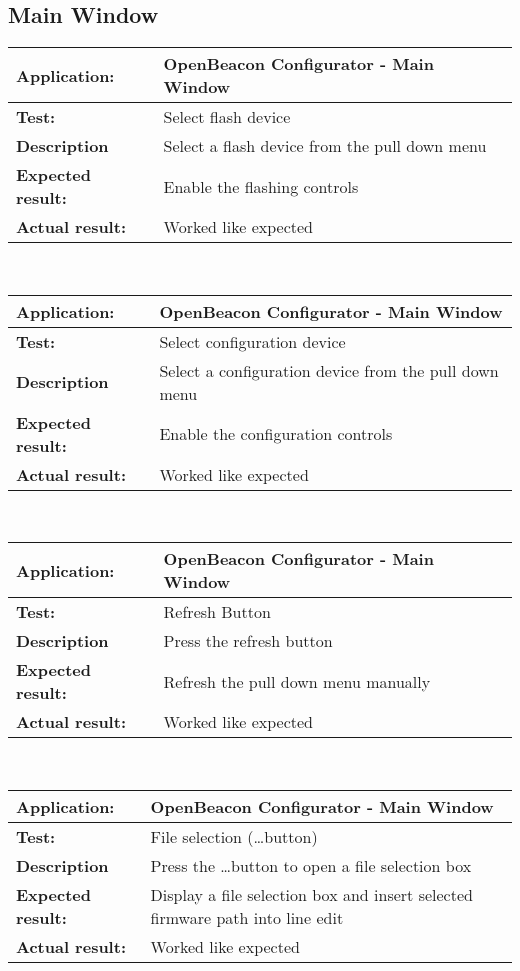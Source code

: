   \subsection{Main Window}
   \begin{tabular}{|p{3.5cm}|p{10.5cm}|}
    \hline
     \textbf{Application:}	& OpenBeacon Configurator - Main Window\\
    \hline
     \textbf{Test:}		& Select flash device\\
    \hline
     \textbf{Description}	& Select a flash device from the pull down menu\\
    \hline
     \textbf{Expected result:}	& Enable the flashing controls\\
    \hline
     \textbf{Actual result:}	& Worked like expected\\
    \hline
   \end{tabular}\\
   \begin{tabular}{|p{3.5cm}|p{10.5cm}|}
    \hline
     \textbf{Application:}	& OpenBeacon Configurator - Main Window\\
    \hline
     \textbf{Test:}		& Select configuration device\\
    \hline
     \textbf{Description}	& Select a configuration device from the pull down menu\\
    \hline
     \textbf{Expected result:}	& Enable the configuration controls\\
    \hline
     \textbf{Actual result:}	& Worked like expected\\
    \hline
   \end{tabular}\\
   \begin{tabular}{|p{3.5cm}|p{10.5cm}|}
    \hline
     \textbf{Application:}	& OpenBeacon Configurator - Main Window\\
    \hline
     \textbf{Test:}		& Refresh Button\\
    \hline
     \textbf{Description}	& Press the refresh button\\
    \hline
     \textbf{Expected result:}	& Refresh the pull down menu manually\\
    \hline
     \textbf{Actual result:}	& Worked like expected\\
    \hline
   \end{tabular}\\
   \begin{tabular}{|p{3.5cm}|p{10.5cm}|}
    \hline
     \textbf{Application:}	& OpenBeacon Configurator - Main Window\\
    \hline
     \textbf{Test:}		& File selection (\dots button)\\
    \hline
     \textbf{Description}	& Press the \dots button to open a file selection box\\
    \hline
     \textbf{Expected result:}	& Display a file selection box and insert selected firmware path into line edit\\
    \hline
     \textbf{Actual result:}	& Worked like expected\\
    \hline
   \end{tabular}\\
